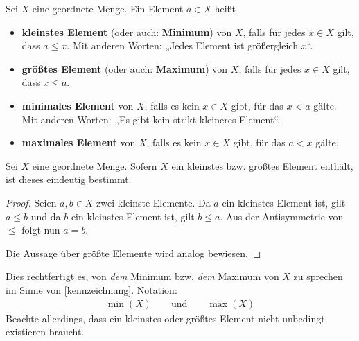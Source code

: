 \begin{defin} \label{def:kleinstes}      
Sei $X$ eine geordnete Menge. Ein Element $a\in X$ heißt
    \begin{itemize}
        \item \textbf{kleinstes Element} (oder auch: \textbf{Minimum}) von $X$, falls für jedes $x\in X$ gilt, dass $a\le x$. Mit anderen Worten: „Jedes Element ist größergleich $x$“.
        \item \textbf{größtes Element} (oder auch: \textbf{Maximum}) von $X$, falls für jedes $x\in X$ gilt, dass $x\le a$.
        \item \textbf{minimales Element} von $X$, falls es kein $x\in X$ gibt, für das $x<a$ gälte. Mit anderen Worten: „Es gibt kein strikt kleineres Element“.
        \item \textbf{maximales Element} von $X$, falls es kein $x\in X$ gibt, für das $a<x$ gälte.
    \end{itemize}
\end{defin}


\begin{satz} \label{kleinsteseind}
    Sei $X$ eine geordnete Menge. Sofern $X$ ein kleinstes bzw. größtes Element enthält, ist dieses eindeutig bestimmt.
\end{satz}
\begin{proof}
    Seien $a,b\in X$ zwei kleinste Elemente. Da $a$ ein kleinstes Element ist, gilt $a\le b$ und da $b$ ein kleinstes Element ist, gilt $b\le a$. Aus der Antisymmetrie von $\le$ folgt nun $a=b$.

    Die Aussage über größte Elemente wird analog bewiesen.
\end{proof}


\begin{nota}
    Dies rechtfertigt es, von \emph{dem} Minimum bzw. \emph{dem} Maximum von $X$ zu sprechen im Sinne von \cref{kennzeichnung}. Notation:
    \begin{align*}
        \min(X) \qquad\text{und}\qquad \max(X)
    \end{align*}
    Beachte allerdings, dass ein kleinstes oder größtes Element nicht unbedingt existieren braucht.
\end{nota}


